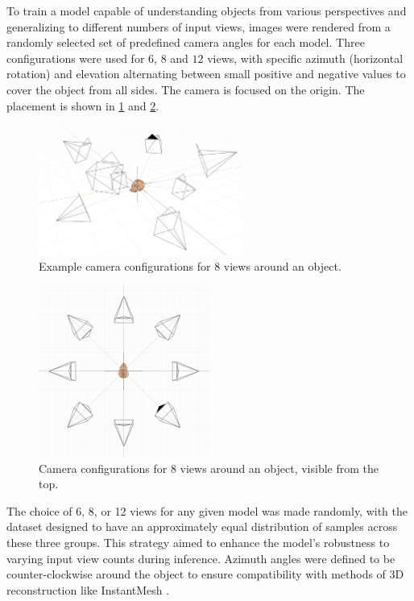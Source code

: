To train a model capable of understanding objects from various perspectives and generalizing to different numbers of input views, images were rendered from a randomly selected set of predefined camera angles for each model. Three configurations were used for $6$, $8$ and $12$ views, with specific azimuth (horizontal rotation) and elevation alternating between small positive and negative values to cover the object from all sides. The camera is focused on the origin. The placement is shown in \ref{fig:camera-setups} and \ref{fig:camera-setups-up}.

\begin{figure}[h]
  \centering
  \includegraphics[width=0.6\textwidth]{images/data/rendering-ortho.jpeg}
  \caption{Example camera configurations for 8 views around an object.}
  \label{fig:camera-setups}
\end{figure}

\begin{figure}[h]
  \centering
  \includegraphics[width=0.5\textwidth, angle=180]{images/data/rendering-up.jpeg}
  \caption{Camera configurations for 8 views around an object, visible from the top.}
  \label{fig:camera-setups-up}
\end{figure}

The choice of 6, 8, or 12 views for any given model was made randomly, with the dataset designed to have an approximately equal distribution of samples across these three groups. This strategy aimed to enhance the model's robustness to varying input view counts during inference. Azimuth angles were defined to be counter-clockwise around the object to ensure compatibility with methods of 3D reconstruction like InstantMesh \cite{instantmesh}.

